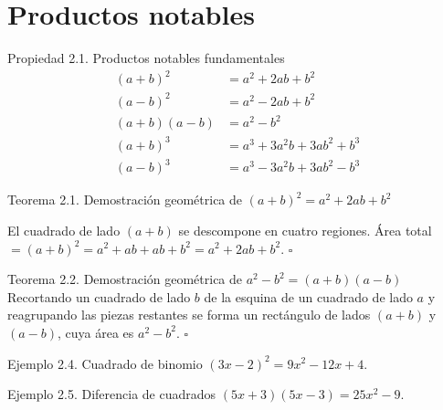 \documentclass[12pt,letterpaper]{book}
\begin{document}
\section{Productos notables}

\begin{propbox}{Propiedad 2.1. Productos notables fundamentales}
\begin{align}
(a+b)^2 &= a^2+2ab+b^2\\
(a-b)^2 &= a^2-2ab+b^2\\
(a+b)(a-b) &= a^2-b^2\\
(a+b)^3 &= a^3+3a^2b+3ab^2+b^3\\
(a-b)^3 &= a^3-3a^2b+3ab^2-b^3
\end{align}
\end{propbox}

\begin{thmbox}{Teorema 2.1. Demostración geométrica de $(a+b)^2=a^2+2ab+b^2$}
\begin{center}
\end{center}
El cuadrado de lado $(a+b)$ se descompone en cuatro regiones. Área total $=(a+b)^2=a^2+ab+ab+b^2=a^2+2ab+b^2$. $\square$
\end{thmbox}

\begin{thmbox}{Teorema 2.2. Demostración geométrica de $a^2-b^2=(a+b)(a-b)$}
Recortando un cuadrado de lado $b$ de la esquina de un cuadrado de lado $a$ y reagrupando las piezas restantes se forma un rectángulo de lados $(a+b)$ y $(a-b)$, cuya área es $a^2-b^2$. $\square$
\end{thmbox}

\begin{ejbox}{Ejemplo 2.4. Cuadrado de binomio}
$(3x-2)^2=9x^2-12x+4$.
\end{ejbox}

\begin{ejbox}{Ejemplo 2.5. Diferencia de cuadrados}
$(5x+3)(5x-3)=25x^2-9$.
\end{ejbox}
\end{document}
